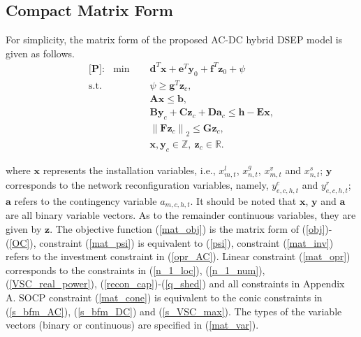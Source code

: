 \documentclass[a4paper,fleqn]{cas-dc}
\begin{document}
\subsection{Compact Matrix Form}

For simplicity, the matrix form of the proposed AC-DC hybrid DSEP model 
is given as follows.
\vspace{2pt}
\begin{align}
    \label{mat_obj}
    \textbf{[P]}: \ \ \min \quad &
    \boldsymbol{d}^{T} \boldsymbol{x} + 
    \boldsymbol{e}^{T} \boldsymbol{y}_{0} + 
    \boldsymbol{f}^{T} \boldsymbol{z}_{0} + \psi \\
    \label{mat_psi}
    \text {s.t.} \quad & 
    \psi \geq \boldsymbol{g}^{T} \boldsymbol{z}_{c}, \\
    \label{mat_inv}
    & \boldsymbol{A} \boldsymbol{x} \leq \boldsymbol{b}, \\
    \label{mat_opr}
    & \boldsymbol{B} \boldsymbol{y}_{c} + 
    \boldsymbol{C} \boldsymbol{z}_{c} + 
    \boldsymbol{D} \boldsymbol{a}_{c} \leq 
    \boldsymbol{h} - \boldsymbol{E} \boldsymbol{x}, \\
    \label{mat_cone}
    & \left\| \boldsymbol{F} \boldsymbol{z}_{c} \right\|_{2} \leq 
    \boldsymbol{G} \boldsymbol{z}_{c}, \\
    \label{mat_var}
    & \boldsymbol{x}, \boldsymbol{y}_{c} \in \mathbb{Z}, \
    \boldsymbol{z}_{c} \in \mathbb{R}.
\end{align}

\noindent where $ \boldsymbol{x} $ represents the installation variables,
i.e., $ x_{m,t}^{l} $, $ x_{n,t}^{g} $, $ x_{m,t}^{v} $ and $ x_{n,t}^{s} $;
$ \boldsymbol{y} $ corresponds to the network reconfiguration variables, 
namely, $ y_{e,c,h,t}^{c} $ and $ y_{e,c,h,t}^{r} $;
$ \boldsymbol{a} $ refers to the contingency variable $ a_{m,c,h,t} $.
It should be noted that $ \boldsymbol{x} $, $ \boldsymbol{y} $ and 
$ \boldsymbol{a} $ are all binary variable vectors. As to the remainder 
continuous variables, they are given by $ \boldsymbol{z} $.
The objective function (\ref{mat_obj}) is the matrix form of 
(\ref{obj})-(\ref{OC}), constraint (\ref{mat_psi}) is equivalent to 
(\ref{psi}), constraint (\ref{mat_inv}) refers to the investment 
constraint in (\ref{opr_AC}). 
{\color{blue}
Linear constraint (\ref{mat_opr}) corresponds to 
the constraints in (\ref{n_1_loc}), (\ref{n_1_num}), (\ref{VSC_real_power}),
(\ref{recon_cap})-(\ref{q_shed}) and all constraints in Appendix A. SOCP 
constraint (\ref{mat_cone}) is equivalent to the conic constraints in 
(\ref{s_bfm_AC}), (\ref{s_bfm_DC}) and (\ref{s_VSC_max}).
The types of the variable vectors (binary or continuous) are specified in 
(\ref{mat_var}).
}
\end{document}
